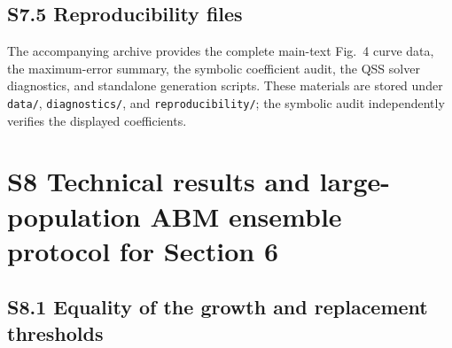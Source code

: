 \documentclass[9pt,a4paper]{article}
\begin{document}
\subsection*{S7.5 Reproducibility files}

The accompanying archive provides the complete main-text Fig.~4 curve data, the maximum-error summary, the symbolic coefficient audit, the QSS solver diagnostics, and standalone generation scripts. These materials are stored under \texttt{data/}, \texttt{diagnostics/}, and \texttt{reproducibility/}; the symbolic audit independently verifies the displayed coefficients.

\section*{S8 Technical results and large-population ABM ensemble protocol for Section 6}

\subsection*{S8.1 Equality of the growth and replacement thresholds}
\end{document}
